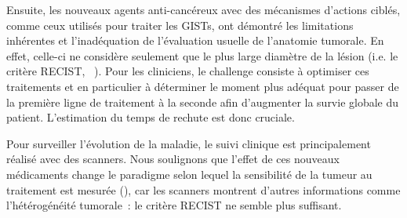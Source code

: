 \documentclass[main.tex]{subfiles}
\begin{document}
Ensuite, les nouveaux agents anti-cancéreux avec des mécanismes d'actions ciblés, comme ceux utilisés pour traiter les GISTs, ont démontré les limitations inhérentes et l'inadéquation de  l'évaluation usuelle de l'anatomie tumorale. En effet, celle-ci ne considère seulement que le plus large diamètre de la lésion (i.e. le critère RECIST, \cf~\cite{suzuki2008}). 
Pour les cliniciens, le challenge consiste à optimiser ces traitements et en particulier à déterminer le moment plus adéquat pour passer de la première ligne de traitement à la seconde afin d'augmenter la survie globale du patient. L'estimation du temps de rechute est donc cruciale.


Pour surveiller l'évolution de la maladie, le suivi clinique est principalement réalisé avec des scanners. 
Nous soulignons que l'effet de ces nouveaux médicaments change le paradigme selon lequel la sensibilité de la tumeur au traitement est mesurée (\cf \cite{schramm2013}), car les scanners montrent d'autres informations comme l'hétérogénéité tumorale~: le critère RECIST ne semble plus suffisant.
\end{document}
